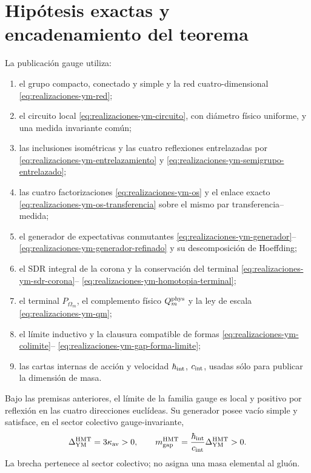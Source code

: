 \section*{Hipótesis exactas y encadenamiento del teorema}

La publicación gauge utiliza:
\begin{enumerate}
 \item el grupo compacto, conectado y simple y la red cuatro-dimensional
       \eqref{eq:realizaciones-ym-red};
 \item el circuito local \eqref{eq:realizaciones-ym-circuito}, con diámetro
       físico uniforme, y una medida invariante común;
 \item las inclusiones isométricas y las cuatro reflexiones entrelazadas por
       \eqref{eq:realizaciones-ym-entrelazamiento} y
       \eqref{eq:realizaciones-ym-semigrupo-entrelazado};
 \item las cuatro factorizaciones
       \eqref{eq:realizaciones-ym-os} y el enlace exacto
       \eqref{eq:realizaciones-ym-os-transferencia} sobre el mismo par
       transferencia--medida;
 \item el generador de expectativas conmutantes
       \eqref{eq:realizaciones-ym-generador}--
       \eqref{eq:realizaciones-ym-generador-refinado} y su descomposición de
       Hoeffding;
 \item el SDR integral de la corona y la conservación del terminal
       \eqref{eq:realizaciones-ym-sdr-corona}--
       \eqref{eq:realizaciones-ym-homotopia-terminal};
 \item el terminal \(P_{\Omega_m}\), el complemento físico
       \(Q_m^{\rm phys}\) y la ley de escala
       \eqref{eq:realizaciones-ym-qm};
 \item el límite inductivo y la clausura compatible de formas
       \eqref{eq:realizaciones-ym-colimite}--
       \eqref{eq:realizaciones-ym-gap-forma-limite};
 \item las cartas internas de acción y velocidad
       \(\hbar_{\rm int}\), \(c_{\rm int}\), usadas sólo para publicar la
       dimensión de masa.
\end{enumerate}

\begin{theorem}
\label{thm:realizaciones-ym}
Bajo las premisas anteriores, el límite de la familia gauge es local y
positivo por reflexión en las cuatro direcciones euclídeas. Su generador
posee vacío simple y satisface, en el sector colectivo gauge-invariante,
\begin{equation}\label{eq:realizaciones-ym-gap-limite}
 \Delta_{\rm YM}^{\rm HMT}=3\kappa_{\rm av}>0,
 \qquad
 m_{\rm gap}^{\rm HMT}
 =\frac{\hbar_{\rm int}}{c_{\rm int}}
  \Delta_{\rm YM}^{\rm HMT}>0.
\end{equation}
La brecha pertenece al sector colectivo; no asigna una masa elemental al
gluón.
\end{theorem}

